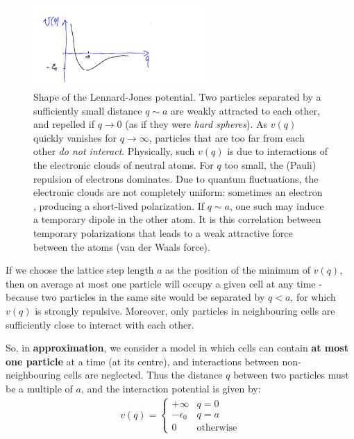 \documentclass[../template.tex]{subfiles}
\begin{document}
\begin{figure}[H]
    \centering
    \includegraphics[width=0.6\textwidth]{image009.png}
    \caption{Shape of the Lennard-Jones potential. Two particles separated by a sufficiently small distance $q \sim a$ are weakly attracted to each other, and repelled if $q \to 0$ (as if they were \textit{hard spheres}). As $v(q)$ quickly vanishes for $q \to \infty$, particles that are too far from each other \textit{do not interact}. Physically, such $v(q)$ is due to interactions of the electronic clouds of neutral atoms. For $q$ too small, the (Pauli) repulsion of electrons dominates. Due to quantum fluctuations, the electronic clouds are not completely uniform: sometimes an electron , producing a short-lived polarization. If $q \sim a$, one such  may induce a temporary dipole in the other atom. It is this correlation between temporary polarizations that leads to a weak attractive force between the atoms (van der Waals force). \label{fig:lg-potential}}
\end{figure}

If we choose the lattice step length $a$ as the position of the minimum of $v(q)$, then on average at most one particle will occupy a given cell at any time - because two particles in the same site would be separated by $q < a$, for which $v(q)$ is strongly repulsive. Moreover, only particles in neighbouring cells are sufficiently close to interact with each other.

\medskip

So, in \textbf{approximation}, we consider a model in which cells can contain \textbf{at most one particle} at a time (at its centre), and interactions between non-neighbouring cells are neglected. Thus the distance $q$ between two particles must be a multiple of $a$, and the interaction potential is given by:
\begin{align*}
    v(q) = \begin{cases}
        +\infty & q = 0\\
        -\epsilon_0 & q=a\\
        0 & \text{otherwise}
    \end{cases}
\end{align*}
\end{document}
